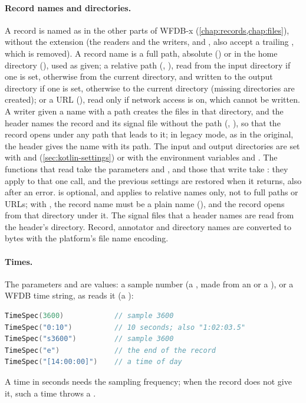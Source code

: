 \paragraph{Record names and directories.} A record is named as in the other parts of
WFDB-x (\cref{chap:records,chap:files}), without the  extension (the readers
and the writers,  and , also accept a trailing
, which is removed). A record name is a full path, absolute () or in the home
directory (), used as given; a relative path
(, ), read from the input directory if one is set,
otherwise from the current directory, and written to the output directory if one is set,
otherwise to the current directory (missing directories are created); or a URL
(), read only if network access is
on, which cannot be written. A writer given a name with a path creates the files in that
directory, and the header names the record and its signal file without the path
(, ), so that the record opens under any path that leads to it;
in legacy mode, as in the original, the header gives the name with its path. The input
and output directories are set with  and 
(\cref{sec:kotlin-settings}) or with the environment variables 
and . The functions that read take the parameters  and , and those
that write take : they apply to that one call, and the previous settings are
restored when it returns, also after an error.  is optional, and applies
to relative names only, not to full paths or URLs; with , the record name must
be a plain name (), and the record opens from that directory under it. The
signal files that a header names are read from the header's directory. Record, annotator and directory names are converted to
bytes with the platform's file name encoding.

\paragraph{Times.} The parameters  and  are  values: a
sample number (a , made from an  or a ), or a
WFDB time string, as  reads it (a ):
\begin{lstlisting}[language=Kotlin]
TimeSpec(3600)            // sample 3600
TimeSpec("0:10")          // 10 seconds; also "1:02:03.5"
TimeSpec("s3600")         // sample 3600
TimeSpec("e")             // the end of the record
TimeSpec("[14:00:00]")    // a time of day
\end{lstlisting}
A time in seconds needs the sampling frequency; when the record does not give it, such a
time throws a .

